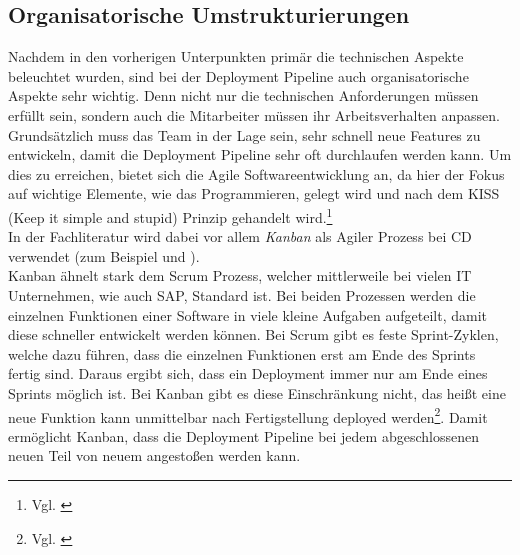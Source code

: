 \subsection{Organisatorische Umstrukturierungen}
Nachdem in den vorherigen Unterpunkten primär die technischen Aspekte beleuchtet wurden, sind bei der Deployment Pipeline auch organisatorische Aspekte sehr wichtig. Denn nicht nur die technischen Anforderungen müssen erfüllt sein, sondern auch die Mitarbeiter müssen ihr Arbeitsverhalten anpassen. Grundsätzlich muss das Team in der Lage sein, sehr schnell neue Features zu entwickeln, damit die Deployment Pipeline sehr oft durchlaufen werden kann. Um dies zu erreichen, bietet sich die Agile Softwareentwicklung an, da hier der Fokus auf wichtige Elemente, wie das Programmieren, gelegt wird und nach dem \acs{KISS} (Keep it simple and stupid) Prinzip gehandelt wird.\footnote{Vgl. \cite[ Kapitel 2]{swartout_continuous_2012}}\\ In der Fachliteratur  wird dabei vor allem \textit{Kanban} als Agiler Prozess bei \acs{CD} verwendet (zum Beispiel \cite{continuous_dev} und \cite{swartout_continuous_2012}).\\
Kanban ähnelt stark dem Scrum Prozess, welcher mittlerweile bei vielen IT Unternehmen, wie auch SAP, Standard ist. Bei beiden Prozessen werden die einzelnen Funktionen einer Software in viele kleine Aufgaben aufgeteilt, damit diese schneller entwickelt werden können. Bei Scrum gibt es feste Sprint-Zyklen, welche dazu führen, dass die einzelnen Funktionen erst am Ende des Sprints fertig sind. Daraus ergibt sich, dass ein Deployment immer nur am Ende eines Sprints möglich ist. Bei Kanban gibt es diese Einschränkung nicht, das heißt eine neue Funktion kann unmittelbar nach Fertigstellung deployed werden\footnote{Vgl. \cite[Seite 50]{Kniberg2010}}. Damit ermöglicht Kanban, dass die Deployment Pipeline bei jedem abgeschlossenen neuen Teil von neuem angestoßen werden kann.

